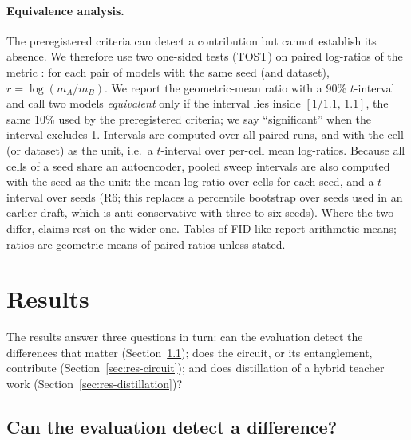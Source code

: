 \documentclass[11pt]{article}
\newcommand{\fidlike}{FID-like}
\begin{document}
\paragraph{Equivalence analysis.} The preregistered criteria can detect a
contribution but cannot establish its absence. We therefore use two one-sided
tests (TOST) on paired log-ratios of the metric \citep{lakens2017tost}: for each
pair of models with the same seed (and dataset), $r=\log(m_A/m_B)$. We report the
geometric-mean ratio with a 90\% $t$-interval and call two models
\emph{equivalent} only if the interval lies inside $[1/1.1,\,1.1]$, the same 10\%
used by the preregistered criteria; we say ``significant'' when the interval
excludes 1. Intervals are computed over all paired runs, and with the cell (or
dataset) as the unit, i.e.\ a $t$-interval over per-cell mean log-ratios. Because
all cells of a seed share an autoencoder, pooled sweep intervals are also computed
with the seed as the unit: the mean log-ratio over cells for each seed, and a
$t$-interval over seeds (R6; this replaces a percentile bootstrap over seeds used in
an earlier draft, which is anti-conservative with three to six seeds). Where the two
differ, claims rest on the wider one. Tables of \fidlike{} report arithmetic means; ratios are geometric
means of paired ratios unless stated.

\section{Results}
\label{sec:results}

The results answer three questions in turn: can the evaluation detect the
differences that matter (Section~\ref{sec:res-eval}); does the circuit, or its
entanglement, contribute (Section~\ref{sec:res-circuit}); and does distillation of
a hybrid teacher work (Section~\ref{sec:res-distillation})?

\subsection{Can the evaluation detect a difference?}
\label{sec:res-eval}
\end{document}
